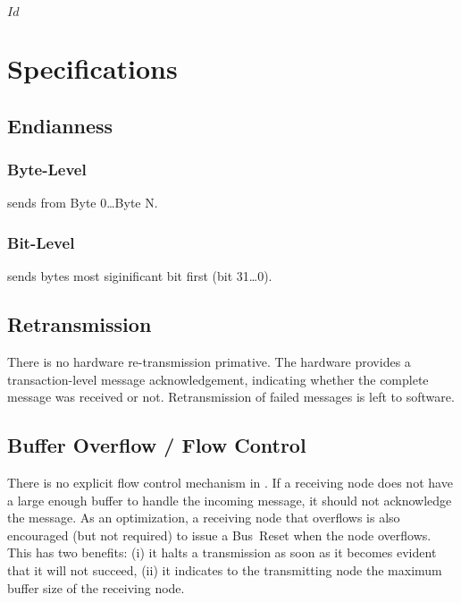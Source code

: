 \svnInfo $Id$

\section{Specifications}

\subsection{Endianness}

\subsubsection{Byte-Level}
\bus sends from Byte 0{\ldots}Byte N.

\subsubsection{Bit-Level}
\bus sends bytes most siginificant bit first (bit 31{\ldots}0).

\subsection{Retransmission}
There is no hardware re-transmission primative. The hardware provides a
transaction-level message acknowledgement, indicating whether the complete
message was received or not. Retransmission of failed messages is left to
software.

\subsection{Buffer Overflow / Flow Control}
There is no explicit flow control mechanism in \bus. If a receiving node does
not have a large enough buffer to handle the incoming message, it should not
acknowledge the message. As an optimization, a receiving node that overflows
is also encouraged (but not required) to issue a Bus~Reset when the node
overflows. This has two benefits: (i) it halts a transmission as soon as it
becomes evident that it will not succeed, (ii) it indicates to the
transmitting node the maximum buffer size of the receiving node.
